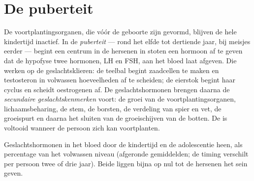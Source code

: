 \section{De puberteit}

\begin{proposition}[De puberteit]\label{prop:g11:becoming-male-female:puberty}
De voortplantingsorganen, die vóór de geboorte zijn gevormd, blijven de
hele kindertijd inactief. In de \emph{puberteit} --- rond
het elfde tot dertiende jaar, bij meisjes eerder --- begint een centrum in
de hersenen in stoten een hormoon af te geven dat de hypofyse twee
hormonen, LH en FSH, aan het bloed laat afgeven. Die werken op de
geslachtsklieren: de teelbal begint zaadcellen te maken en testosteron in
volwassen hoeveelheden af te scheiden; de eierstok begint haar cyclus en
scheidt oestrogenen af. De geslachtshormonen brengen daarna de
\emph{secundaire geslachtskenmerken} voort: de groei van de
voortplantingsorganen, lichaamsbeharing, de stem, de borsten, de verdeling
van spier en vet, de groeispurt en daarna het sluiten van de groeischijven
van de botten. De  is voltooid wanneer de persoon zich kan
voortplanten.
\end{proposition}
\admitted

\begin{omfigure}

{\small Geslachtshormonen in het bloed door de kindertijd en de
adolescentie heen, als percentage van het volwassen niveau (afgeronde
gemiddelden; de timing verschilt per persoon twee of drie jaar). Beide
liggen bijna op nul tot de hersenen het sein geven.}
\end{omfigure}

